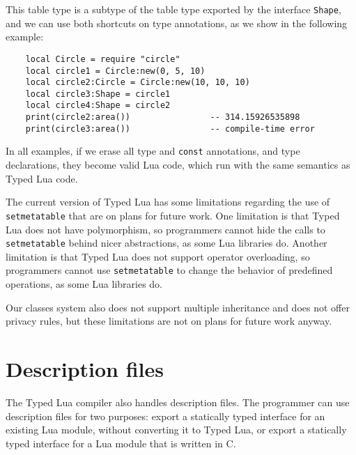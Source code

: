 This table type is a subtype of the table type exported by the interface \texttt{Shape},
and we can use both shortcuts on type annotations, as we show in the following example:
\begin{verbatim}
    local Circle = require "circle"
    local circle1 = Circle:new(0, 5, 10)
    local circle2:Circle = Circle:new(10, 10, 10)
    local circle3:Shape = circle1
    local circle4:Shape = circle2
    print(circle2:area())                -- 314.15926535898
    print(circle3:area())                -- compile-time error
\end{verbatim}

In all examples, if we erase all type and \texttt{const} annotations,
and type declarations, they become valid Lua code, which run with the
same semantics as Typed Lua code.

The current version of Typed Lua has some limitations regarding
the use of \texttt{setmetatable} that are on plans for future work.
One limitation is that Typed Lua does not have polymorphism,
so programmers cannot hide the calls to \texttt{setmetatable} behind
nicer abstractions, as some Lua libraries do.
Another limitation is that Typed Lua does not support operator overloading,
so programmers cannot use \texttt{setmetatable} to change the behavior
of predefined operations, as some Lua libraries do.

Our classes system also does not support multiple inheritance
and does not offer privacy rules, but these limitations are not
on plans for future work anyway.

\section{Description files}

The Typed Lua compiler also handles description files.
The programmer can use description files for two purposes:
export a statically typed interface for an existing Lua
module, without converting it to Typed Lua,
or export a statically typed interface for a Lua module
that is written in C.

